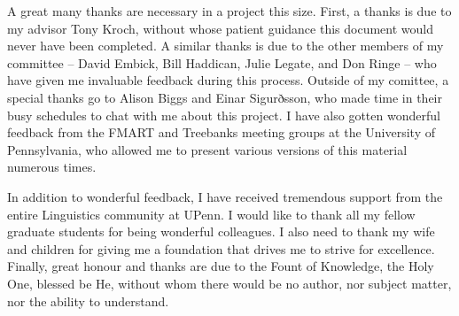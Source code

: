 \begin{singlespace}

	A great many thanks are necessary in a project this size. First, a thanks is due to my advisor Tony Kroch, without whose patient guidance this document would never have been completed. A similar thanks is due to the other members of my committee -- David Embick, Bill Haddican, Julie Legate, and Don Ringe -- who have given me invaluable feedback during this process. Outside of my comittee, a special thanks go to Alison Biggs and Einar Sigurðsson, who made time in their busy schedules to chat with me about this project. I have also gotten wonderful feedback from the FMART and Treebanks meeting groups at the University of Pennsylvania, who allowed me to present various versions of this material numerous times.

	In addition to wonderful feedback, I have received tremendous support from the entire Linguistics community at UPenn. I would like to thank all my fellow graduate students for being wonderful colleagues. I also need to thank my wife and children for giving me a foundation that drives me to strive for excellence. Finally, great honour and thanks are due to the Fount of Knowledge, the Holy One, blessed be He, without whom there would be no author, nor subject matter, nor the ability to understand. 

\end{singlespace}
